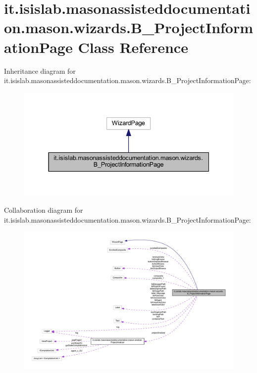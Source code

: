 \hypertarget{classit_1_1isislab_1_1masonassisteddocumentation_1_1mason_1_1wizards_1_1_b___project_information_page}{\section{it.\-isislab.\-masonassisteddocumentation.\-mason.\-wizards.\-B\-\_\-\-Project\-Information\-Page Class Reference}
\label{classit_1_1isislab_1_1masonassisteddocumentation_1_1mason_1_1wizards_1_1_b___project_information_page}
}


Inheritance diagram for it.\-isislab.\-masonassisteddocumentation.\-mason.\-wizards.\-B\-\_\-\-Project\-Information\-Page\-:\nopagebreak
\begin{figure}[H]
\begin{center}
\leavevmode
\includegraphics[width=337pt]{classit_1_1isislab_1_1masonassisteddocumentation_1_1mason_1_1wizards_1_1_b___project_information_page__inherit__graph}
\end{center}
\end{figure}


Collaboration diagram for it.\-isislab.\-masonassisteddocumentation.\-mason.\-wizards.\-B\-\_\-\-Project\-Information\-Page\-:\nopagebreak
\begin{figure}[H]
\begin{center}
\leavevmode
\includegraphics[width=350pt]{classit_1_1isislab_1_1masonassisteddocumentation_1_1mason_1_1wizards_1_1_b___project_information_page__coll__graph}
\end{center}
\end{figure}
